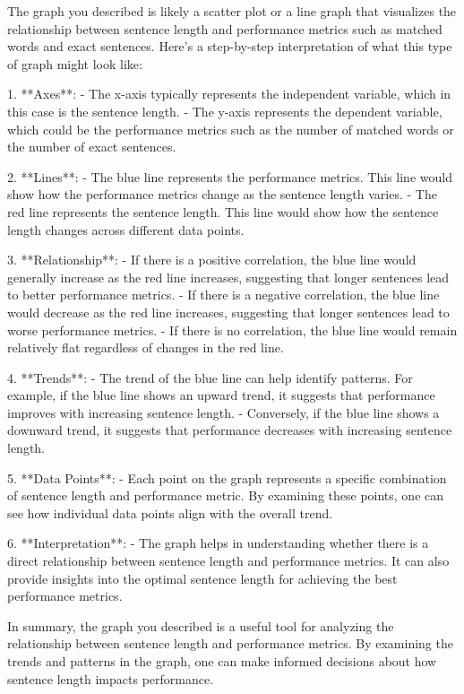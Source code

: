 The graph you described is likely a scatter plot or a line graph that visualizes the relationship between sentence length and performance metrics such as matched words and exact sentences. Here's a step-by-step interpretation of what this type of graph might look like:

1. **Axes**: 
   - The x-axis typically represents the independent variable, which in this case is the sentence length.
   - The y-axis represents the dependent variable, which could be the performance metrics such as the number of matched words or the number of exact sentences.

2. **Lines**:
   - The blue line represents the performance metrics. This line would show how the performance metrics change as the sentence length varies.
   - The red line represents the sentence length. This line would show how the sentence length changes across different data points.

3. **Relationship**:
   - If there is a positive correlation, the blue line would generally increase as the red line increases, suggesting that longer sentences lead to better performance metrics.
   - If there is a negative correlation, the blue line would decrease as the red line increases, suggesting that longer sentences lead to worse performance metrics.
   - If there is no correlation, the blue line would remain relatively flat regardless of changes in the red line.

4. **Trends**:
   - The trend of the blue line can help identify patterns. For example, if the blue line shows an upward trend, it suggests that performance improves with increasing sentence length.
   - Conversely, if the blue line shows a downward trend, it suggests that performance decreases with increasing sentence length.

5. **Data Points**:
   - Each point on the graph represents a specific combination of sentence length and performance metric. By examining these points, one can see how individual data points align with the overall trend.

6. **Interpretation**:
   - The graph helps in understanding whether there is a direct relationship between sentence length and performance metrics. It can also provide insights into the optimal sentence length for achieving the best performance metrics.

In summary, the graph you described is a useful tool for analyzing the relationship between sentence length and performance metrics. By examining the trends and patterns in the graph, one can make informed decisions about how sentence length impacts performance.
